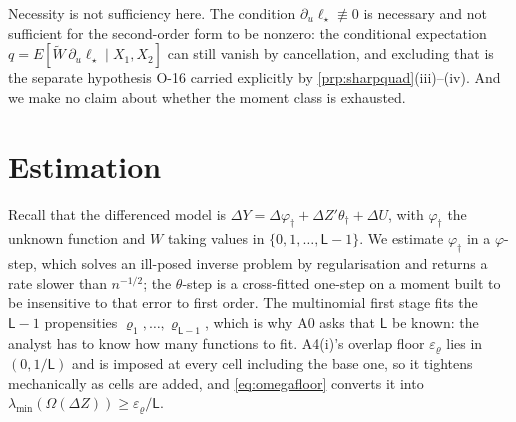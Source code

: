 \documentclass[
  12pt]{article}
\newcommand{\1}[1]{\mathds{1}\left[#1\right]}
\theoremstyle{plain}
\theoremstyle{definition}
\theoremstyle{definition}
\theoremstyle{remark}
\newcommand{\vdagger}{\varphi_{\dagger}}
\begin{document}
Necessity is not sufficiency here. The condition
\(\partial_u\ell_\star\not\equiv0\) is necessary and not sufficient for
the second-order form to be nonzero: the conditional expectation
\(q=E[\widetilde W\,\partial_u\ell_\star\mid X_1,X_2]\) can still vanish
by cancellation, and excluding that is the separate hypothesis O-16
carried explicitly by \cref{prp:sharpquad}(iii)--(iv). And we make no
claim about whether the moment class is exhausted.



\section{Estimation}\label{estimation}

Recall that the differenced model is
\(\Delta Y=\Delta\vdagger+\Delta Z'\theta_\dagger+\Delta U\), with
\(\vdagger\) the unknown function and \(W\) taking values in
\(\{0,1,\dots,\mathsf L-1\}\). We estimate \(\vdagger\) in a
\(\varphi\)-step, which solves an ill-posed inverse problem by
regularisation and returns a rate slower than \(n^{-1/2}\); the
\(\theta\)-step is a cross-fitted one-step on a moment built to be
insensitive to that error to first order. The multinomial first stage
fits the \(\mathsf L-1\) propensities
\(\varrho_1,\dots,\varrho_{\mathsf L-1}\), which is why A0 asks that
\(\mathsf L\) be known: the analyst has to know how many functions to
fit. A4(i)'s overlap floor \(\varepsilon_\varrho\) lies in
\((0,1/\mathsf L)\) and is imposed at every cell including the base one,
so it tightens mechanically as cells are added, and
\eqref{eq:omegafloor} converts it into
\(\lambda_{\min}(\Omega(\Delta Z))\ge\varepsilon_\varrho/\mathsf L\).
\end{document}

